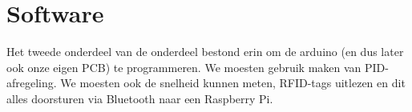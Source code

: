 \section{Software}
Het tweede onderdeel van de onderdeel bestond erin om de arduino (en dus later ook onze eigen PCB) te programmeren. We moesten gebruik maken van PID-afregeling. We moesten ook de snelheid kunnen meten, RFID-tags uitlezen en dit alles doorsturen via Bluetooth naar een Raspberry Pi.
 



